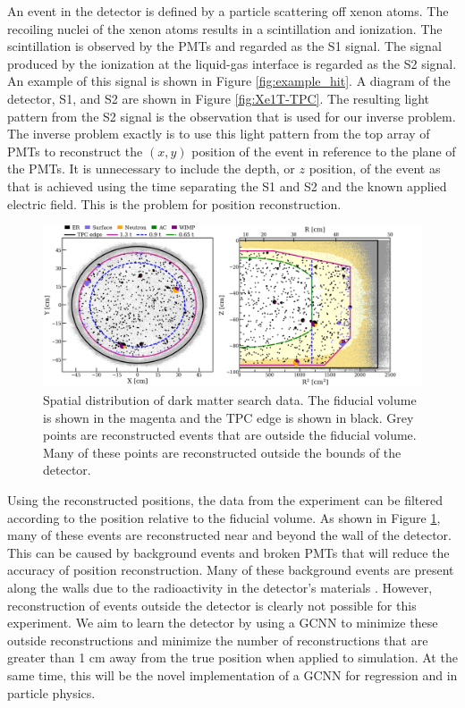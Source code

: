 \documentclass[../thesis.tex]{subfiles}
\begin{document}
\par An event in the detector is defined by a particle scattering off xenon atoms.
The recoiling nuclei of the xenon atoms results in a scintillation and ionization.
The scintillation is observed by the PMTs and regarded as the S1 signal.
The signal produced by the ionization at the liquid-gas interface is regarded as the S2 signal.
An example of this signal is shown in Figure \ref{fig:example_hit}.
A diagram of the detector, S1, and S2 are shown in Figure \ref{fig:Xe1T-TPC}.
The resulting light pattern from the S2 signal is the observation that is used for our inverse problem.
The inverse problem exactly is to use this light pattern from the top array of PMTs to reconstruct the $(x, y)$ position of the event in reference to the plane of the PMTs.
It is unnecessary to include the depth, or $z$ position, of the event as that is achieved using the time separating the S1 and S2 and the known applied electric field.
This is the problem for position reconstruction.

\begin{figure}[t]
	\centering
	\includegraphics[width=\linewidth]{figures/reconstruction_distribution.png}
	\caption{
	Spatial distribution of dark matter search data.
	The fiducial volume is shown in the magenta and the TPC edge is shown in black.
	Grey points are reconstructed events that are outside the fiducial volume.
	Many of these points are reconstructed outside the bounds of the detector.
	\cite{Xe1T-YearExpo}
	}
	\label{fig:reco-distro}
\end{figure}
\par Using the reconstructed positions, the data from the experiment can be filtered according to the position relative to the fiducial volume.
As shown in Figure \ref{fig:reco-distro}, many of these events are reconstructed near and beyond the wall of the detector.
This can be caused by background events and broken PMTs that will reduce the accuracy of position reconstruction.
Many of these background events are present along the walls due to the radioactivity in the detector's materials \cite{Xe1T-YearExpo}.
However, reconstruction of events outside the detector is clearly not possible for this experiment.
We aim to learn the detector by using a GCNN to minimize these outside reconstructions and minimize the number of reconstructions that are greater than 1 cm away from the true position when applied to simulation.
At the same time, this will be the novel implementation of a GCNN for regression and in particle physics.
\end{document}
